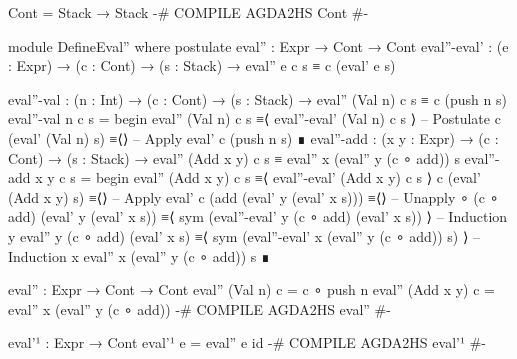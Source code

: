 \documentclass{article}
\begin{document}
\begin{code}
Cont = Stack → Stack
{-# COMPILE AGDA2HS Cont #-}

module DefineEval'' where
  postulate
    eval'' : Expr → Cont → Cont
    eval''-eval' : (e : Expr) → (c : Cont) → (s : Stack)
      → eval'' e c s ≡ c (eval' e s)

  eval''-val : (n : Int) → (c : Cont) → (s : Stack)
    → eval'' (Val n) c s ≡ c (push n s)
  eval''-val n c s =
    begin
      eval'' (Val n) c s
    ≡⟨ eval''-eval' (Val n) c s ⟩ -- Postulate
      c (eval' (Val n) s)
    ≡⟨⟩ -- Apply eval'
      c (push n s)
    ∎
  eval''-add : (x y : Expr) → (c : Cont) → (s : Stack)
    → eval'' (Add x y) c s ≡ eval'' x (eval'' y (c ∘ add)) s
  eval''-add x y c s =
    begin
      eval'' (Add x y) c s
    ≡⟨ eval''-eval' (Add x y) c s ⟩
      c (eval' (Add x y) s)
    ≡⟨⟩ -- Apply eval'
      c (add (eval' y (eval' x s)))
    ≡⟨⟩ -- Unapply ∘
      (c ∘ add) (eval' y (eval' x s))
    ≡⟨ sym (eval''-eval' y (c ∘ add) (eval' x s)) ⟩ -- Induction y
      eval'' y (c ∘ add) (eval' x s)
    ≡⟨ sym (eval''-eval' x (eval'' y (c ∘ add)) s) ⟩ -- Induction x
      eval'' x (eval'' y (c ∘ add)) s
    ∎
\end{code}
\begin{code}
eval'' : Expr → Cont → Cont
eval'' (Val n) c = c ∘ push n
eval'' (Add x y) c = eval'' x (eval'' y (c ∘ add))
{-# COMPILE AGDA2HS eval'' #-}

eval'¹ : Expr → Cont
eval'¹ e = eval'' e id
{-# COMPILE AGDA2HS eval'¹ #-}
\end{code}
\end{document}

